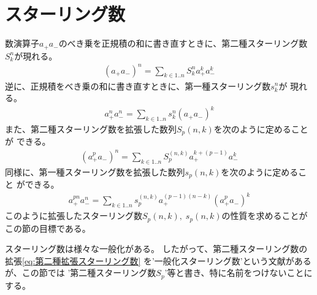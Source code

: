 \section{スターリング数}\label{s1:スターリング数} %
	数演算子$a_+a_-$のべき乗を正規積の和に書き直すときに、第二種スターリング数
	$S_k^n$が現れる。
	\begin{equation}\label{eq:第二種スターリング数}\begin{split} %
		(a_+a_-)^n = \sum_{k\in1..n} S_k^n a_+^ka_-^k
	\end{split}\end{equation} %
	逆に、正規積をべき乗の和に書き直すときに、第一種スターリング数$s_k^n$が
	現れる。
	\begin{equation*}\begin{split} %
		a_+^na_-^n = \sum_{k\in1..n} s_k^n (a_+a_-)^k
	\end{split}\end{equation*} %
	また、第二種スターリング数を拡張した数列$S_p(n,k)$を次のように定めることが
	できる。
	\begin{equation}\label{eq:第二種拡張スターリング数}\begin{split} %
		(a_+^pa_-)^n = \sum_{k\in1..n} S_p^(n,k) a_+^{k+(p-1)}a_-^k
	\end{split}\end{equation} %
	同様に、第一種スターリング数を拡張した数列$s_p(n,k)$を次のように定めること
	ができる。
	\begin{equation*}\begin{split} %
		a_+^{pn}a_-^n = \sum_{k\in1..n} s_p^(n,k) a_+^{(p-1)(n-k)}(a_+^pa_-)^k
	\end{split}\end{equation*} %
	このように拡張したスターリング数$S_p(n,k),\;s_p(n,k)$の性質を求めることが
	この節の目標である。

	スターリング数は様々な一般化がある\cite{hsu.stirling}。
	したがって、第二種スターリング数の拡張\eqref{eq:第二種拡張スターリング数}
	を'一般化スターリング数'という文献があるが、この節では
	'第二種スターリング数$S_p$'等と書き、特に名前をつけないことにする。

